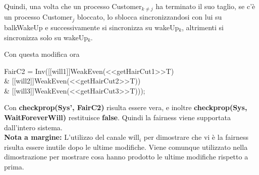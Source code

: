 Quindi, una volta che un processo \textsf{Customer$_{k\not=j}$} ha terminato il suo taglio, se c'è un processo \textsf{Customer$_{j}$} bloccato, lo sblocca sincronizzandosi con lui su \textsf{balkWakeUp} e successivamente si sincronizza su \textsf{wakeUp$_{k}$}, altrimenti si sincronizza solo su \textsf{wakeUp$_{k}$}.

Con questa modifica ora 

\begin{center}
	\textsf{FairC2 = Inv([[will1]]WeakEven(<<getHairCut1>>T) \\\& [[will2]]WeakEven(<<getHairCut2>>T)) \\\& [[will3]]WeakEven(<<getHairCut3>>T)));}
\end{center}

Con \textbf{checkprop(Sys', FairC2)} risulta essere vera, e inoltre \textbf{checkprop(Sys, WaitForeverWill)} restituisce \textbf{false}. Quindi la fairness viene supportata dall'intero sistema. \\

\textbf{Nota a margine:} L'utilizzo del canale \textsf{will$_{i}$} per dimostrare che vi è la fairness risulta essere inutile dopo le ultime modifiche. Viene comunque utilizzato nella dimostrazione per mostrare cosa hanno prodotto le ultime modifiche rispetto a prima.